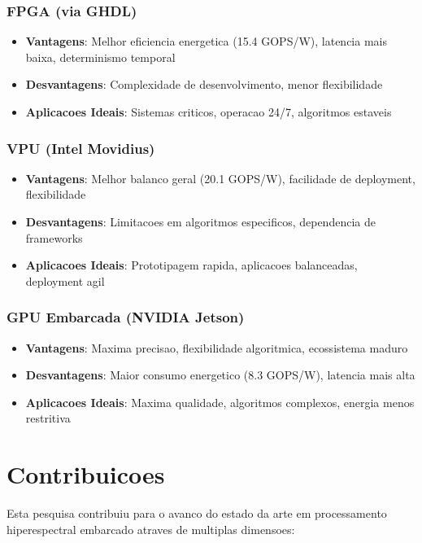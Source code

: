 \subsubsection{FPGA (via GHDL)}
\begin{itemize}
    \item \textbf{Vantagens}: Melhor eficiencia energetica (15.4 GOPS/W), latencia mais baixa, determinismo temporal
    \item \textbf{Desvantagens}: Complexidade de desenvolvimento, menor flexibilidade
    \item \textbf{Aplicacoes Ideais}: Sistemas criticos, operacao 24/7, algoritmos estaveis
\end{itemize}

\subsubsection{VPU (Intel Movidius)}
\begin{itemize}
    \item \textbf{Vantagens}: Melhor balanco geral (20.1 GOPS/W), facilidade de deployment, flexibilidade
    \item \textbf{Desvantagens}: Limitacoes em algoritmos especificos, dependencia de frameworks
    \item \textbf{Aplicacoes Ideais}: Prototipagem rapida, aplicacoes balanceadas, deployment agil
\end{itemize}

\subsubsection{GPU Embarcada (NVIDIA Jetson)}
\begin{itemize}
    \item \textbf{Vantagens}: Maxima precisao, flexibilidade algoritmica, ecossistema maduro
    \item \textbf{Desvantagens}: Maior consumo energetico (8.3 GOPS/W), latencia mais alta
    \item \textbf{Aplicacoes Ideais}: Maxima qualidade, algoritmos complexos, energia menos restritiva
\end{itemize}

\section{Contribuicoes}\label{sec:contribuicoes}

Esta pesquisa contribuiu para o avanco do estado da arte em processamento hiperespectral embarcado atraves de multiplas dimensoes:

